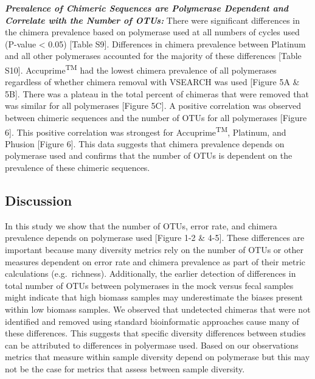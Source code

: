 \documentclass[12pt,]{article}
\begin{document}
\textbf{\emph{Prevalence of Chimeric Sequences are Polymerase Dependent
and Correlate with the Number of OTUs:}} There were significant
differences in the chimera prevalence based on polymerase used at all
numbers of cycles used (P-value \textless{} 0.05) {[}Table S9{]}.
Differences in chimera prevalence between Platinum and all other
polymerases accounted for the majority of these differences {[}Table
S10{]}. Accuprime\textsuperscript{TM} had the lowest chimera prevalence
of all polymerases regardless of whether chimera removal with VSEARCH
was used {[}Figure 5A \& 5B{]}. There was a plateau in the total percent
of chimeras that were removed that was similar for all polymerases
{[}Figure 5C{]}. A positive correlation was observed between chimeric
sequences and the number of OTUs for all polymerases {[}Figure 6{]}.
This positive correlation was strongest for
Accuprime\textsuperscript{TM}, Platinum, and Phusion {[}Figure 6{]}.
This data suggests that chimera prevalence depends on polymerase used
and confirms that the number of OTUs is dependent on the prevalence of
these chimeric sequences.

\newpage

\subsection{Discussion}\label{discussion}

In this study we show that the number of OTUs, error rate, and chimera
prevalence depends on polymerase used {[}Figure 1-2 \& 4-5{]}. These
differences are important because many diversity metrics rely on the
number of OTUs or other measures dependent on error rate and chimera
prevalence as part of their metric calculations (e.g.~richness).
Additionally, the earlier detection of differences in total number of
OTUs between polymerases in the mock versus fecal samples might indicate
that high biomass samples may underestimate the biases present within
low biomass samples. We observed that undetected chimeras that were not
identified and removed using standard bioinformatic approaches cause
many of these differences. This suggests that specific diversity
differences between studies can be attributed to differences in
polyermase used. Based on our observations metrics that measure within
sample diversity depend on polymerase but this may not be the case for
metrics that assess between sample diversity.
\end{document}
